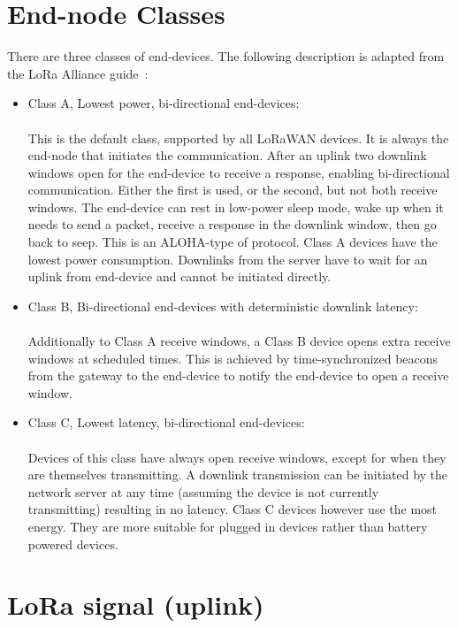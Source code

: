 \section{End-node Classes}
There are three classes of end-devices. The following description is adapted from the LoRa Alliance guide~\cite{about_lora_wan,what_is_lora}:
\begin{itemize}
    \item Class A, Lowest power, bi-directional end-devices:\\
    \\
    This is the default class, supported by all LoRaWAN devices.
    It is always the end-node that initiates the communication. After an uplink
    two downlink windows open for the end-device to receive a response, enabling bi-directional communication.
    Either the first is used, or the second, but not both receive windows.
    The end-device can rest in low-power sleep mode, wake up when it needs to send a packet, receive a response
    in the downlink window, then go back to seep. This is an ALOHA-type of protocol. Class A devices have the lowest 
    power consumption. Downlinks from the server have to wait for an uplink from end-device and cannot be initiated directly.
    \item Class B, Bi-directional end-devices with deterministic downlink latency:\\
    \\ 
    Additionally to Class A receive windows, a Class B device opens extra receive windows at scheduled times.
    This is achieved by time-synchronized beacons from the gateway to the end-device to notify the end-device
    to open a receive window.

    \item Class C, Lowest latency, bi-directional end-devices:\\
    \\
    Devices of this class have always open receive windows, except for when they are themselves transmitting.
    A downlink transmission can be initiated by the network server at any time (assuming the device is not currently transmitting)
    resulting in no latency. Class C devices however use the most energy. They are more suitable for plugged in devices rather than
    battery powered devices.

\end{itemize}

\newpage


\section{LoRa signal (uplink)}
